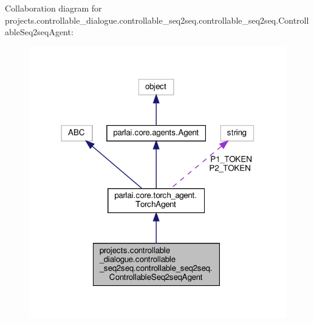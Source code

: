 Collaboration diagram for projects.\+controllable\+\_\+dialogue.\+controllable\+\_\+seq2seq.\+controllable\+\_\+seq2seq.\+Controllable\+Seq2seq\+Agent\+:
\nopagebreak
\begin{figure}[H]
\begin{center}
\leavevmode
\includegraphics[width=318pt]{classprojects_1_1controllable__dialogue_1_1controllable__seq2seq_1_1controllable__seq2seq_1_1Con19d93f1a2a924e8b6c8b2d9d045183f4}
\end{center}
\end{figure}

